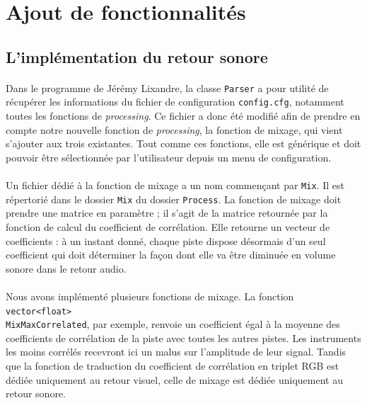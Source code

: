 \newpage
\section{Ajout de fonctionnalités}

\subsection{L'implémentation du retour sonore}
\paragraph{}
Dans le programme de Jérémy Lixandre, la classe \verb!Parser! a pour
utilité de récupérer les informations du fichier de configuration
\verb!config.cfg!, notamment toutes les fonctions de
\textit{processing}. Ce fichier a donc été modifié afin de prendre en
compte notre nouvelle fonction de \textit{processing}, la fonction de
mixage, qui vient s'ajouter aux trois existantes. Tout comme ces
fonctions, elle est générique et doit pouvoir être sélectionnée par
l'utilisateur depuis un menu de configuration.

\paragraph{}
Un fichier dédié à la fonction de mixage a un nom commençant par
\verb!Mix!. Il est répertorié dans le dossier \verb!Mix! du dossier
\verb!Process!. La fonction de mixage doit prendre une matrice en
paramètre ; il s'agit de la matrice retournée par la fonction de
calcul du coefficient de corrélation. Elle retourne un vecteur de
coefficients : à un instant donné, chaque piste dispose désormais d'un
seul coefficient qui doit déterminer la façon dont elle va être
diminuée en volume sonore dans le retour audio.

\paragraph{}
Nous avons implémenté plusieurs fonctions de mixage. La fonction
\verb!vector<float>!
\\ \verb!MixMaxCorrelated!, par
exemple, renvoie un coefficient égal à la moyenne des coefficients de
corrélation de la piste avec toutes les autres pistes. Les instruments
les moins corrélés recevront ici un malus sur l'amplitude de leur signal.
Tandis que la fonction de traduction du coefficient de corrélation en
triplet RGB est dédiée uniquement au retour visuel, celle de mixage est
dédiée uniquement au retour sonore.

